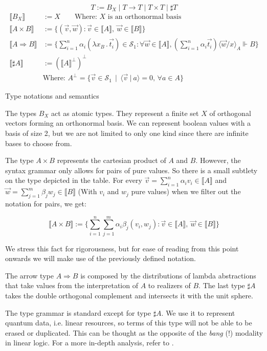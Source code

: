\documentclass[runningheads,orivec]{llncs}
\newcommand\comp[2][]{#2^{\bot^{#1}}}
\newcommand\ansubst[2]{\ensuremath{\langle #1 \rangle_{#2}}}
\def\Sph{\mathcal{S}_1}       %
\def\scal#1#2{\langle{#1}~|~{#2}\rangle}
\def\Lam#1#2#3{\lambda#1_{#2}\,{.}\,#3} %
\def\Arr{\Rightarrow}
\def\sem#1{\llbracket#1\rrbracket}
\def\real{\Vdash}
\newcommand\basis[1]{\ensuremath{B_{ #1 }}}
\begin{document}
\begin{table*}[tb]
  \scriptsize
    \[
    T := \basis{X} \mid T\to T \mid T\times T \mid \sharp T
    \]
    \begin{align*}
    \sem{\basis{X}}&:= X\qquad\text{Where: $X$ is an orthonormal basis}\\
    \sem{A\times B}&:= \bigl\{ (\vec v, \vec w): \vec v \in{\sem{A}},~\vec w\in\sem{B}\bigr\}\\
    \sem{A\Arr B}&:=
    \bigl\{\sum_{i=1}^{n}\alpha_i(\Lam{x}{B}{\vec{t_i}})\in\Sph:\forall\vec{w}\in\sem{A}, (\sum_{i=1}^{n}\alpha_i \vec{t_i})\ansubst{\vec{w}/x}{A}\real B\bigr\}\\
    \sem{\sharp{A}}&:= {(\sem{A}^\bot)}^\bot\\
    &\text{Where: }\comp{A} = \{ \vec{v}\in \Sph \,\mid\, \scal{\vec{v}}{a} = 0,\, \forall a\in A\}
  \end{align*}
  \caption{Type notations and semantics}
  \label{tab:UnitaryTypes}
\end{table*}

The types $\basis{X}$ act as atomic types. They represent a finite set $X$ of orthogonal vectors forming an orthonormal basis. We can represent boolean values with a basis of size 2, but we are not limited to only one kind since there are infinite bases to choose from.

The type $A\times B$ represents the cartesian product of $A$ and $B$. However, the syntax grammar only allows for pairs of pure values. So there is a small subtlety on the type depicted in the table. For every $\vec{v}=\sum_{i=1}^{n}\alpha_i v_i\in\sem{A}$ and $\vec{w}=\sum_{j=1}^{m}\beta_j w_j\in\sem{B}$ (With $v_i$ and $w_j$ pure values) when we filter out the notation for pairs, we get:

\[
  \sem{A\times B}:= \bigl\{ \sum_{i=1}^{n}\sum_{j=1}^{m}\alpha_i\beta_j(v_i, w_j): \vec v \in{\sem{A}},~\vec w\in\sem{B}\bigr\}
\]

We stress this fact for rigorousness, but for ease of reading from this point onwards we will make use of the previously defined notation.

The arrow type $A\Arr B$ is composed by the distributions of lambda abstractions that take values from the interpretation of $A$ to realizers of $B$. The last type $\sharp A$ takes the double orthogonal complement and intersects it with the unit sphere. 

The type grammar is standard except for type $\sharp A$. We use it to represent quantum data, i.e. linear resources, so terms of this type will not be able to be erased or duplicated. This can be thought as the opposite of the \textit{bang} ($!$) modality in linear logic. For a more in-depth analysis, refer to \cite{DiazcaroCIE2025}.
\end{document}
